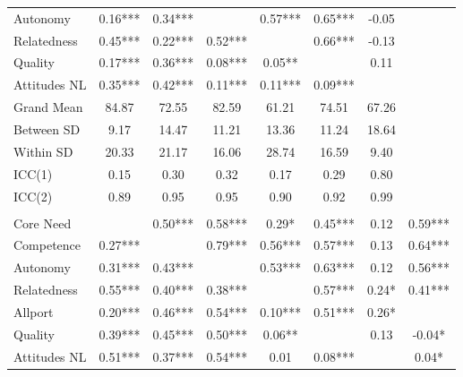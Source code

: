\begin{table}
\begin{minipage}[t][\textheight][t]{\textwidth}
{\begin{tabular}[t]{lccccccc}
\hspace{1em}Autonomy & 0.16*** & 0.34*** &  & 0.57*** & 0.65*** & -0.05 & \\
\hspace{1em}Relatedness & 0.45*** & 0.22*** & 0.52*** &  & 0.66*** & -0.13 & \\
\hspace{1em}Quality & 0.17*** & 0.36*** & 0.08*** & 0.05** &  & 0.11 & \\
\hspace{1em}Attitudes NL & 0.35*** & 0.42*** & 0.11*** & 0.11*** & 0.09*** &  & \\
\addlinespace
\hspace{1em}Grand Mean & 84.87 & 72.55 & 82.59 & 61.21 & 74.51 & 67.26 & \\
\hspace{1em}Between SD & 9.17 & 14.47 & 11.21 & 13.36 & 11.24 & 18.64 & \\
\hspace{1em}Within SD & 20.33 & 21.17 & 16.06 & 28.74 & 16.59 & 9.40 & \\
\hspace{1em}ICC(1) & 0.15 & 0.30 & 0.32 & 0.17 & 0.29 & 0.80 & \\
\hspace{1em}ICC(2) & 0.89 & 0.95 & 0.95 & 0.90 & 0.92 & 0.99 & \\
\addlinespace[0.3em]
\multicolumn{8}{l}{\textbf{Study 3}}\\
\hspace{1em}Core Need &  & 0.50*** & 0.58*** & 0.29* & 0.45*** & 0.12 & 0.59***\\
\hspace{1em}Competence & 0.27*** &  & 0.79*** & 0.56*** & 0.57*** & 0.13 & 0.64***\\
\hspace{1em}Autonomy & 0.31*** & 0.43*** &  & 0.53*** & 0.63*** & 0.12 & 0.56***\\
\hspace{1em}Relatedness & 0.55*** & 0.40*** & 0.38*** &  & 0.57*** & 0.24* & 0.41***\\
\hspace{1em}Allport & 0.20*** & 0.46*** & 0.54*** & 0.10*** & 0.51*** & 0.26* & \\
\hspace{1em}Quality & 0.39*** & 0.45*** & 0.50*** & 0.06** &  & 0.13 & -0.04*\\
\hspace{1em}Attitudes NL & 0.51*** & 0.37*** & 0.54*** & 0.01 & 0.08*** &  & 0.04*\\

\end{tabular}}
\end{minipage}
\end{table}
